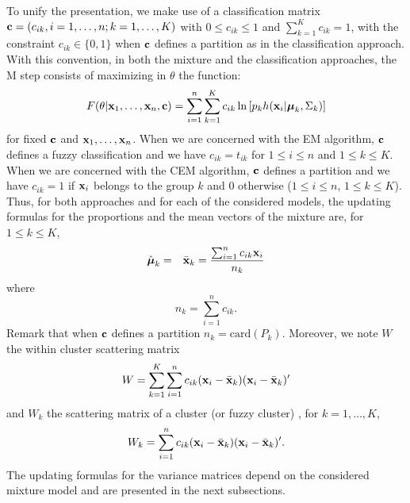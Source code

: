 \documentclass[12pt]{article}
\newcommand{\bmu}{\boldsymbol{\mu}}
\begin{document}
To unify the presentation, we make use of a classification matrix ${\bf c}=(c_{ik},
i=1,\ldots,n; k=1,\ldots,K)$ with $0\leq c_{ik} \leq 1$ and $\sum_{k=1}^{K}c_{ik}=1$, with the
constraint $c_{ik} \in \{0, 1\}$ when ${\bf c}$ defines a partition as in the classification
approach. With this convention, in both the mixture and the classification approaches, the M
step consists of maximizing in $\theta$ the function:
\begin{equation}
  F(\theta| {\bf x}_{1},\ldots,{\bf x}_{n}, {\bf
    c})=\sum_{i=1}^{n}\sum_{k=1}^{K} c_{ik} \ln \left [p_{k}  h({\bf
      x}_{i}|\bmu_{k},\Sigma_{k})\right ] \label{eq:Mstep}
\end{equation}
for fixed ${\bf c}$ and ${\bf x}_{1},\ldots,{\bf x}_{n}$. When we are concerned with the EM
algorithm, ${\bf c}$ defines a fuzzy classification and we have $c_{ik}=t_{ik}$ for $1 \leq i
\leq n$ and $1 \leq k \leq K$. When we are concerned with the CEM algorithm, ${\bf c}$ defines
a partition and we have $c_{ik}= 1$ if ${\bf x}_{i}$ belongs to the group $k$ and $0$ otherwise
($1 \leq i \leq n$, $1 \leq k \leq K$). Thus, for both approaches and for each of the
considered models, the updating formulas for the proportions and the mean vectors of the
mixture are, for $1 \leq k \leq K$,
\begin{eqnarray}
  \hat{\bmu}_{k}&=& \bar{\bf x}_k=\frac{\sum_{i=1}^{n}c_{ik}{\bf x}_{i}}{n_k}
\end{eqnarray}
where
\begin{equation}
  n_k=\sum_{i=1}^{n}c_{ik} \label{eq:nk}.
\end{equation}
Remark that when ${\bf c}$ defines a partition
$n_k=\mbox{card}(P_k)$. Moreover, we note $W$ the within cluster
scattering matrix
\begin{equation} \label{w}
  W=\sum_{k=1}^{K}\sum_{i=1}^{n}c_{ik}({\bf x}_{i}- \bar{\bf
    x}_{k})({\bf x}_{i}- \bar{\bf x}_{k})'
\end{equation}
and $W_k$ the scattering matrix of a cluster (or fuzzy cluster) , for $k=1,\ldots,K$,
\begin{equation} \label{wk}
W_k=\sum_{i=1}^{n} c_{ik}({\bf x}_{i}- \bar{\bf x}_k)({\bf x}_i-
\bar{\bf x}_k)'.
\end{equation}
The updating formulas for the variance matrices depend on the considered mixture model and are
presented in the next subsections.
\end{document}
